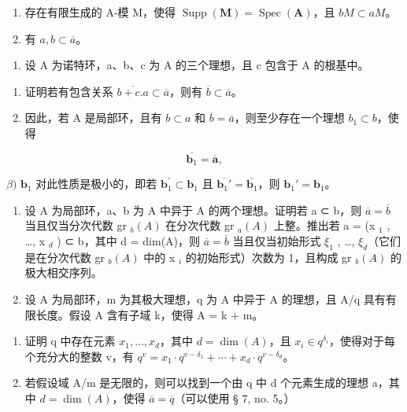 \begin{enumerate}
\def\labelenumi{(\roman{enumi})}
\tightlist
\item
  存在有限生成的 A-模 M，使得 \(\operatorname{Supp}(\mathbf{M}) = \operatorname{Spec}(\mathbf{A})\)，且 \(bM \subset aM\)。\\
\item
  有 \(a, b \subset \overline{a}\)。
\end{enumerate}

\begin{enumerate}
\def\labelenumi{\arabic{enumi})}
\setcounter{enumi}{11}
\tightlist
\item
  设 A 为诺特环，a、b、c 为 A 的三个理想，且 c 包含于 A 的根基中。
\end{enumerate}

\begin{enumerate}
\def\labelenumi{\alph{enumi})}
\item
  证明若有包含关系 \(\overline{b + c.a} \subset \overline{a}\)，则有 \(\overline{b} \subset \overline{a}\)。
\item
  因此，若 A 是局部环，且有 \(b \subset a\) 和 \(\overline{b} = \overline{a}\)，则至少存在一个理想 \(b_{1} \subset b\)，使得
\end{enumerate}

\[
\overline {{{\mathbf {b} _ {1}}}} = \overline {{{\mathbf {a}}}},
\]

\(\beta)\) \(\mathbf{b}_{1}\) 对此性质是极小的，即若 \(\mathbf{b}_{1}^{\prime}\subset \mathbf{b}_{1}\) 且 \(\overline{\mathbf{b}_1'} = \overline{\mathbf{b}_1}\)，则 \(\mathbf{b}_1' = \mathbf{b}_1\)。

\begin{enumerate}
\def\labelenumi{\arabic{enumi})}
\setcounter{enumi}{12}
\item
  设 A 为局部环，a、b 为 A 中异于 A 的两个理想。证明若 a ⊂ b，则 \(\overline{a} = \overline{b}\) 当且仅当分次代数 gr \(_b(A)\) 在分次代数 gr \(_a(A)\) 上整。推出若 a = (x \(_1\) , \ldots, x \(_d\) ) ⊂ b，其中 d = dim(A)，则 \(\overline{a} = \overline{b}\) 当且仅当初始形式 \(\xi_{1}\) , \ldots, \(\xi_{d}\)（它们是在分次代数 gr \(_b(A)\) 中的 x \(_i\) 的初始形式）次数为 1，且构成 gr \(_b(A)\) 的极大相交序列。
\item
  设 A 为局部环，m 为其极大理想，q 为 A 中异于 A 的理想，且 A/q 具有有限长度。假设 A 含有子域 k，使得 A = k + m。
\end{enumerate}

\begin{enumerate}
\def\labelenumi{\alph{enumi})}
\tightlist
\item
  证明 q 中存在元素 \(x_{1}, \ldots, x_{d}\)，其中 \(d = \dim(A)\)，且 \(x_{i} \in q^{\delta_{i}}\)，使得对于每个充分大的整数 v，有 \(q^{v} = x_{1} \cdot q^{v - \delta_{1}} + \cdots + x_{d} \cdot q^{v - \delta_{d}}\)。
\item
  若假设域 A/m 是无限的，则可以找到一个由 q 中 d 个元素生成的理想 a，其中 \(d = \dim(A)\)，使得 \(\overline{a} = \overline{q}\)（可以使用 § 7, no. 5。）
\end{enumerate}

